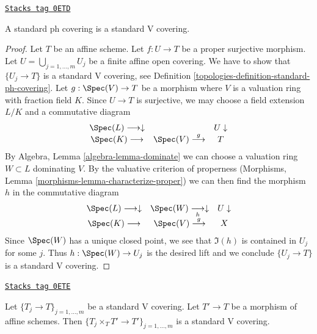 \begin{lemma}
\label{topologies-lemma-standard-ph-standard-V}
\href{https://stacks.math.columbia.edu/tag/0ETD}{\texttt{Stacks tag 0ETD}}

A standard ph covering is a standard V covering.
\end{lemma}

\begin{proof}

Let $T$ be an affine scheme. Let $f : U \to T$ be a proper surjective
morphism. Let $U = \bigcup_{j = 1, \ldots, m} U_j$ be a finite
affine open covering. We have to show that $\{U_j \to T\}$
is a standard V covering, see
Definition \ref{topologies-definition-standard-ph-covering}.
Let $g : \Spec(V) \to T$
be a morphism where $V$ is a valuation ring with fraction field $K$.
Since $U \to T$ is surjective, we may choose a field extension
$L/K$ and a commutative diagram
$$
\begin{array}{ccc}\Spec(L) \longrightarrow\downarrow &  & U \downarrow \\ \Spec(K) \longrightarrow & \Spec(V) \overset{g}{\longrightarrow} & T\end{array}
$$
By Algebra, Lemma \ref{algebra-lemma-dominate} we can choose a valuation ring
$W \subset L$ dominating $V$. By the valuative criterion of
properness (Morphisms, Lemma \ref{morphisms-lemma-characterize-proper})
we can then find the morphism $h$ in the commutative
diagram
$$
\begin{array}{ccc}\Spec(L) \longrightarrow\downarrow & \Spec(W) \underset{h}{\longrightarrow}\downarrow & U \downarrow \\ \Spec(K) \longrightarrow & \Spec(V) \overset{g}{\longrightarrow} & X\end{array}
$$
Since $\Spec(W)$ has a unique closed point, we see that $\Im(h)$
is contained in $U_j$ for some $j$. Thus $h : \Spec(W) \to U_j$
is the desired lift and we conclude $\{U_j \to T\}$ is a standard V covering.
\end{proof}

\begin{lemma}
\label{topologies-lemma-base-change-standard-V}
\href{https://stacks.math.columbia.edu/tag/0ETE}{\texttt{Stacks tag 0ETE}}

Let $\{T_j \to T\}_{j = 1, \ldots, m}$ be a standard V covering.
Let $T' \to T$ be a morphism of affine schemes.
Then $\{T_j \times_T T' \to T'\}_{j = 1, \ldots, m}$ is a
standard V covering.
\end{lemma}

